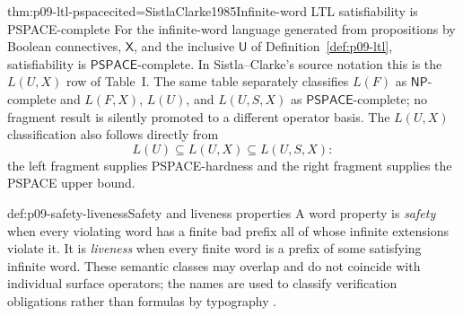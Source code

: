 \begin{hbtheorem}{thm:p09-ltl-pspace}{cited=SistlaClarke1985}{Infinite-word LTL satisfiability is PSPACE-complete}
For the infinite-word language generated from propositions by Boolean
connectives, \(\mathsf X\), and the inclusive \(\mathsf U\) of
Definition~\ref{def:p09-ltl}, satisfiability is
\(\mathsf{PSPACE}\)-complete.  In Sistla--Clarke's source notation this is the
\(L(U,X)\) row of Table~I.  The same table separately classifies
\(L(F)\) as \(\mathsf{NP}\)-complete and \(L(F,X)\), \(L(U)\), and
\(L(U,S,X)\) as \(\mathsf{PSPACE}\)-complete; no fragment result is silently
promoted to a different operator basis.  The \(L(U,X)\) classification also
follows directly from
\[
 L(U)\subseteq L(U,X)\subseteq L(U,S,X):
\]
the left fragment supplies PSPACE-hardness and the right fragment supplies
the PSPACE upper bound.
\end{hbtheorem}

\begin{hbdefinition}{def:p09-safety-liveness}{Safety and liveness properties}
A word property is \emph{safety} when every violating word has a finite bad
prefix all of whose infinite extensions violate it.  It is \emph{liveness}
when every finite word is a prefix of some satisfying infinite word.  These
semantic classes may overlap and do not coincide with individual surface
operators; the names are used to classify verification obligations rather
than formulas by typography \cite{AlpernSchneider1985}.
\end{hbdefinition}

